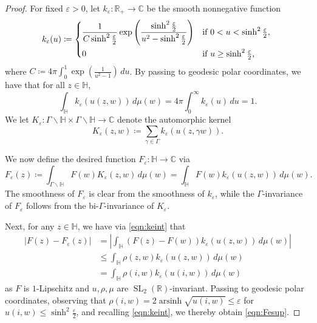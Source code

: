 \documentclass[10pt,a4paper]{amsart}
\DeclareMathOperator{\SL}{SL}
\DeclareMathOperator{\arsinh}{arsinh}
\newcommand{\C}{\mathbb{C}}
\newcommand{\Hb}{\mathbb{H}}
\newcommand{\R}{\mathbb{R}}
\newcommand{\e}{\varepsilon}
\begin{document}
\begin{proof}
For fixed $\e > 0$, let $k_{\e} : \R_+ \to \C$ be the smooth nonnegative function
\[k_{\e}(u) \coloneqq \begin{dcases*}
\frac{1}{C\sinh^2 \frac{\e}{2}} \exp\left(\frac{\sinh^2 \frac{\e}{2}}{u^2 - \sinh^2 \frac{\e}{2}}\right) & if $0 < u < \sinh^2 \frac{\e}{2}$,	\\
0 & if $u \geq \sinh^2 \frac{\e}{2}$,
\end{dcases*}\]
where $C \coloneqq 4\pi \int_{0}^{1} \exp(\frac{1}{u^2 - 1}) \, du$. By passing to geodesic polar coordinates, we have that for all $z \in \Hb$,
\begin{equation}
\label{eqn:keint}
\int_{\Hb} k_{\e}(u(z,w)) \, d\mu(w) = 4\pi \int_{0}^{\infty} k_{\e}(u) \, du = 1.
\end{equation}
We let $K_{\e} : \Gamma \backslash \Hb \times \Gamma \backslash \Hb \to \C$ denote the automorphic kernel
\[K_{\e}(z,w) \coloneqq \sum_{\gamma \in \Gamma} k_{\e}(u(z,\gamma w)).\]

We now define the desired function $F_{\e} : \Hb \to \C$ via
\[F_{\e}(z) \coloneqq \int_{\Gamma \backslash \Hb} F(w) K_{\e}(z,w) \, d\mu(w) = \int_{\Hb} F(w) k_{\e}(u(z,w)) \, d\mu(w).\]
The smoothness of $F_{\e}$ is clear from the smoothness of $k_{\e}$, while the $\Gamma$-invariance of $F_{\e}$ follows from the bi-$\Gamma$-invariance of $K_{\e}$.

Next, for any $z \in \Hb$, we have via \eqref{eqn:keint} that
\begin{align*}
\left|F(z) - F_{\e}(z)\right| & = \left|\int_{\Hb} (F(z) - F(w)) k_{\e}(u(z,w)) \, d\mu(w)\right|	\\
& \leq \int_{\Hb} \rho(z,w) k_{\e}(u(z,w)) \, d\mu(w)	\\
& = \int_{\Hb} \rho(i,w) k_{\e}(u(i,w)) \, d\mu(w)
\end{align*}
as $F$ is $1$-Lipschitz and $u,\rho,\mu$ are $\SL_2(\R)$-invariant. Passing to geodesic polar coordinates, observing that $\rho(i,w) = 2\arsinh\sqrt{u(i,w)} \leq \e$ for $u(i,w) \leq \sinh^2 \frac{\e}{2}$, and recalling \eqref{eqn:keint}, we thereby obtain \eqref{eqn:Fesup}.


\end{proof}
\end{document}
